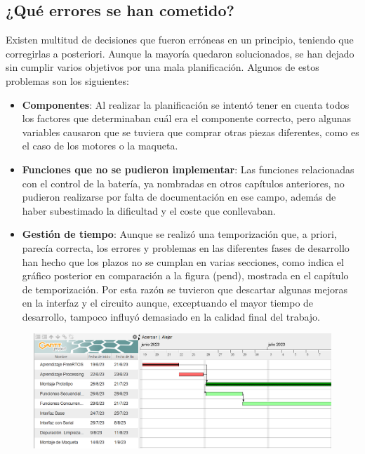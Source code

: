 \subsection{¿Qué errores se han cometido?}

Existen multitud de decisiones que fueron erróneas en un principio, teniendo que corregirlas a posteriori. Aunque la mayoría quedaron solucionados, se han dejado sin cumplir varios objetivos por una mala planificación. Algunos de estos problemas son los siguientes:

\begin{itemize}
    \item \textbf{Componentes}: Al realizar la planificación se intentó tener en cuenta todos los factores que determinaban cuál era el componente correcto, pero algunas variables causaron que se tuviera que comprar otras piezas diferentes, como es el caso de los motores o la maqueta. 
    \item \textbf{Funciones que no se pudieron implementar}: Las funciones relacionadas con el control de la batería, ya nombradas en otros capítulos anteriores, no pudieron realizarse por falta de documentación en ese campo, además de haber subestimado la dificultad y el coste que conllevaban. 
    \item \textbf{Gestión de tiempo}: Aunque se realizó una temporización que, a priori, parecía correcta, los errores y problemas en las diferentes fases de desarrollo han hecho que los plazos no se cumplan en varias secciones, como indica el gráfico posterior en comparación a la figura (pend), mostrada en el capítulo de temporización. Por esta razón se tuvieron que descartar algunas mejoras en la interfaz y el circuito aunque, exceptuando el mayor tiempo de desarrollo, tampoco influyó demasiado en la calidad final del trabajo. 
\end{itemize}

\newpage

\begin{figure}[H]
    \centering
    \includegraphics[width=1\textwidth]{imagenes/gantt_final_p1.png}
\end{figure}



